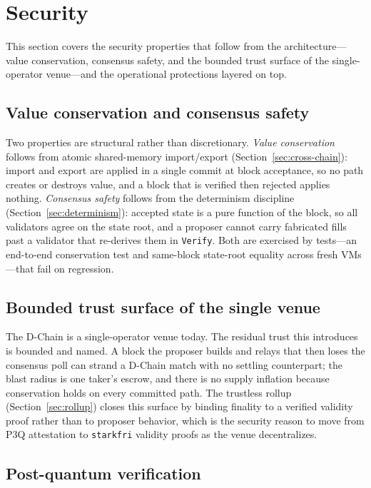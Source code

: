 \section{Security}
\label{sec:security}

This section covers the security properties that follow from the architecture---value
conservation, consensus safety, and the bounded trust surface of the single-operator
venue---and the operational protections layered on top.

\subsection{Value conservation and consensus safety}

Two properties are structural rather than discretionary. \emph{Value conservation} follows
from atomic shared-memory import/export (Section~\ref{sec:cross-chain}): import and export
are applied in a single commit at block acceptance, so no path creates or destroys value,
and a block that is verified then rejected applies nothing. \emph{Consensus safety} follows
from the determinism discipline (Section~\ref{sec:determinism}): accepted state is a pure
function of the block, so all validators agree on the state root, and a proposer cannot
carry fabricated fills past a validator that re-derives them in \texttt{Verify}. Both are
exercised by tests---an end-to-end conservation test and same-block state-root equality
across fresh VMs---that fail on regression.

\subsection{Bounded trust surface of the single venue}

The D-Chain is a single-operator venue today. The residual trust this introduces is bounded
and named. A block the proposer builds and relays that then loses the consensus poll can
strand a D-Chain match with no settling counterpart; the blast radius is one taker's escrow,
and there is no supply inflation because conservation holds on every committed path. The
trustless rollup (Section~\ref{sec:rollup}) closes this surface by binding finality to a
verified validity proof rather than to proposer behavior, which is the security reason to
move from P3Q attestation to \texttt{starkfri} validity proofs as the venue decentralizes.

\subsection{Post-quantum verification}

